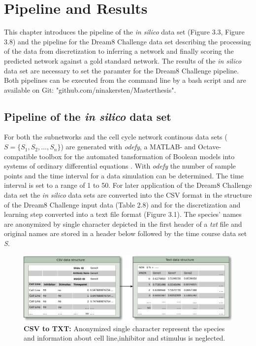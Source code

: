 \chapter{Pipeline and Results}
This chapter introduces the pipeline of the \textit{in silico} data set (Figure 3.3, Figure 3.8) and the pipeline for the Dream8 Challenge data set describing the processing of the data from discretization to inferring a network and finally scoring the predicted network against a gold standard network. The results of the \textit{in silico} data set are necessary to set the paramter for the Dream8 Challenge pipeline. Both pipelines can be executed from the command line by a bash script and are available on Git: "github.com/ninakersten/Masterthesis". 

\section{Pipeline of the \textit{in silico} data set}

For both the subnetworks and the cell cycle network continous data sets ($S=\{ S_{1},S_{2},...,S_{n}\} $) are generated with \textit{odefy}, a MATLAB- and Octave-compatible toolbox for the automated tansformation of Boolean models into systems of ordinary differential equations \citep{Krumsiek2010}. With \textit{odefy} the number of sample points and the time interval for a data simulation can be determined. The time interval is set to a range of 1 to 50. For later application of the Dream8 Challenge data set the \textit{in silico} data sets are converted into the CSV format in the structure of the Dream8 Challenge input data (Table 2.8) and for the discretization and learning step converted into a text file format (Figure 3.1). The species' names are anonymized by single character depicted in the first header of a \textit{txt} file and original names are stored in a header below followed by the time course data set \textit{S}.


\begin{figure}[H]
\captionsetup{width=1.0\linewidth}
\centering
\includegraphics[width=1.0\textwidth]{./Bilder/CSV2TXT.pdf}
\caption[CSV to TXT]{\textbf{CSV to TXT:} Anonymized single character represent the species and information about cell line,inhibitor and stimulus is neglected. }
\label{fig:9}
\end{figure}


